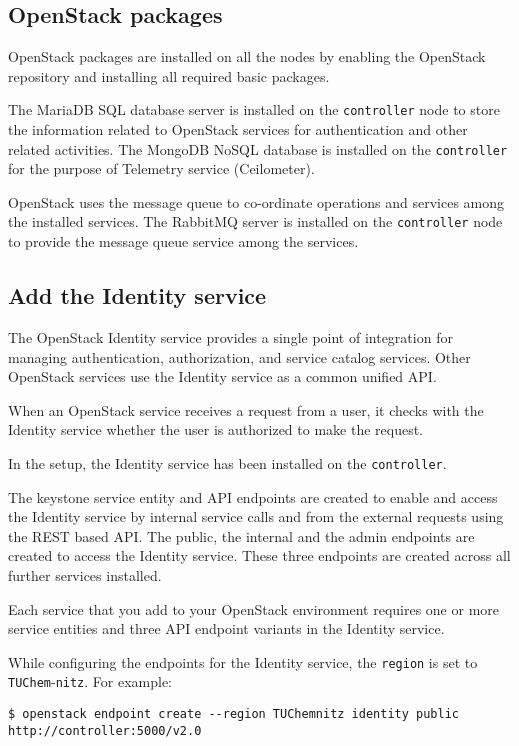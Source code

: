 \subsection{OpenStack packages}\label{ssec:OpenStackpackages}
OpenStack packages are installed on all the nodes by enabling the OpenStack repository and installing all required basic packages.

The MariaDB SQL database server is installed on the \verb|controller| node to store the information related to OpenStack services for authentication and other related activities.
The MongoDB NoSQL database is installed on the \verb|controller| for the purpose of Telemetry service (Ceilometer).

OpenStack uses the message queue to co-ordinate operations and services among the installed services.
The RabbitMQ server is installed on the \verb|controller| node to provide the message queue service among the services.


\subsection{Add the Identity service}\label{ssec:AddtheIdentityservice}
The OpenStack Identity service provides a single point of integration for managing authentication, authorization, and service catalog services.
Other OpenStack services use the Identity service as a common unified API.

When an OpenStack service receives a request from a user, it checks with the Identity service whether the user is authorized to make the request.

In the setup, the Identity service has been installed on the \verb|controller|.

The keystone service entity and API endpoints are created to enable and access the Identity service by internal service calls and from the external requests using the REST based API.
The public, the internal and the admin endpoints are created to access the Identity service.
These three endpoints are created across all further services installed.

Each service that you add to your OpenStack environment requires one or more service entities and three API endpoint variants in the Identity service.

While configuring the endpoints for the Identity service, the \verb|region| is set to \verb|TUChem|-\verb|nitz|.
For example:
\begin{lstlisting}[frame=single]
$ openstack endpoint create --region TUChemnitz identity public http://controller:5000/v2.0
\end{lstlisting}

